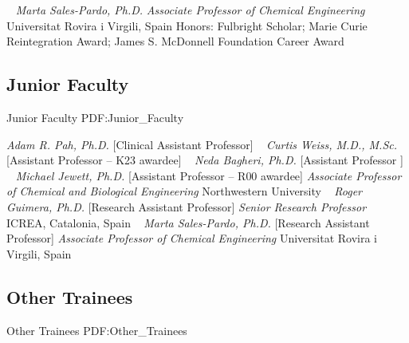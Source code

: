 ~
\Gap{}
\textit{Marta Sales-Pardo, Ph.D.}
\newline
    \textit{Associate Professor of Chemical Engineering}
    \newline
    Universitat Rovira i Virgili, Spain
    \newline
    {\footnotesize Honors: Fulbright Scholar; Marie Curie Reintegration Award; James S. McDonnell Foundation Career Award}
    \newline
~
\Gap\vspace*{0.2cm}\subsection
{Junior Faculty}
{Junior Faculty}
{PDF:Junior_Faculty}

\GapNoBreak
{}
\textit{Adam R. Pah, Ph.D.}
    [Clinical Assistant Professor]
\newline
~
\Gap{}
\textit{Curtis Weiss, M.D., M.Sc.}
    [Assistant Professor -- K23 awardee]
\newline
~
\Gap{}
\textit{Neda Bagheri, Ph.D.}
    [Assistant Professor ]
\newline
~
\Gap{}
\textit{Michael Jewett, Ph.D.}
    [Assistant Professor -- R00 awardee]
\newline
    \textit{Associate Professor of Chemical and Biological Engineering}
    \newline
    Northwestern University
    \newline
~
\Gap{}
\textit{Roger Guimera, Ph.D.}
    [Research Assistant Professor]
\newline
    \textit{Senior Research Professor}
    \newline
    ICREA, Catalonia, Spain
    \newline
~
\Gap{}
\textit{Marta Sales-Pardo, Ph.D.}
    [Research Assistant Professor]
\newline
    \textit{Associate Professor of Chemical Engineering}
    \newline
    Universitat Rovira i Virgili, Spain
    \newline
~
\Gap\vspace*{0.2cm}\subsection
{Other Trainees}
{Other Trainees}
{PDF:Other_Trainees}

